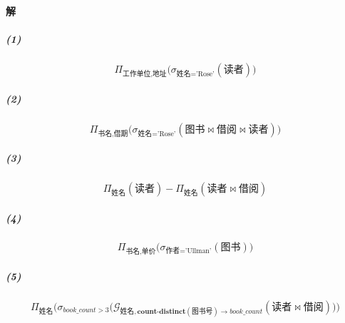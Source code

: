 \documentclass{article}
\begin{document}
\paragraph{解}
\subparagraph{(1)}
{ \kaishu
    \begin{Large}
        \begin{equation*}
            \Pi_{\text{工作单位}, \text{地址}}\big(\sigma_{\text{姓名} = \text{'Rose'}}(\text{读者})\big)
        \end{equation*}
    \end{Large}

    \subparagraph{(2)}
    \begin{Large}
        \begin{equation*}
            \Pi_{\text{书名}, \text{借期}}\big(\sigma_{\text{姓名} = \text{'Rose'}}(\text{图书} \Join \text{借阅} \Join \text{读者})\big)
        \end{equation*}
    \end{Large}

    \subparagraph{(3)}
    \begin{Large}
        \begin{equation*}
            \Pi_{\text{姓名}}(\text{读者}) - \Pi_{\text{姓名}}(\text{读者} \Join \text{借阅})
        \end{equation*}
    \end{Large}

    \subparagraph{(4)}
    \begin{Large}
        \begin{equation*}
            \Pi_{\text{书名}, \text{单价}}\big(\sigma_{\text{作者} = \text{'Ullman'}}(\text{图书})\big)
        \end{equation*}
    \end{Large}

    \subparagraph{(5)}
    \begin{Large}
        \begin{equation*}
            \Pi_{\text{姓名}}\Big(\sigma_{\textit{book\_count} > 3}\big(\mathcal{G}_{\text{姓名}, \textbf{count-distinct}(\text{图书号}) \rightarrow \textit{book\_count}}(\text{读者} \Join \text{借阅})\big)\Big)
        \end{equation*}
    \end{Large}
}
\end{document}
